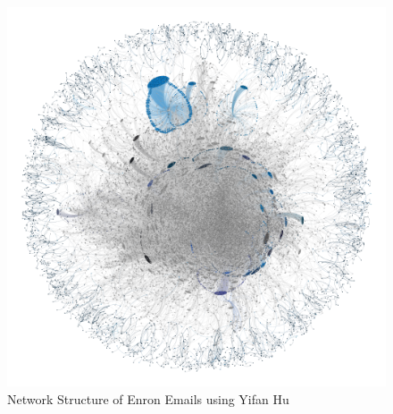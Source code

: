 \documentclass[11pt, oneside]{article}   	%
\begin{document}
	\begin{figure}
  \centering
  \includegraphics[width=\columnwidth]{na-ee-graph-final.png}
  \caption{Network Structure of Enron Emails using Yifan Hu }
\end{figure}
	
\end{document}
